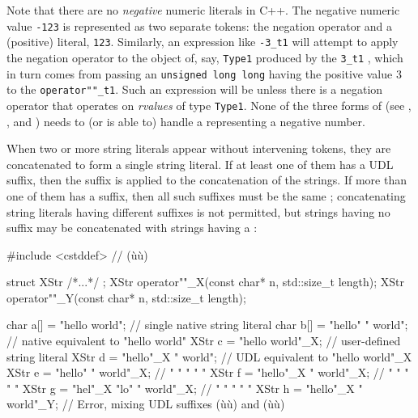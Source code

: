 Note that there are no \emph{negative} numeric literals in C++. The
negative numeric value \lstinline!-123! is represented as two separate
tokens: the negation operator and a (positive) literal, \lstinline!123!.
Similarly, an expression like \lstinline!-3_t1! will attempt to apply the
negation operator to the object of, say, \lstinline!Type1! produced by the
\lstinline!3_t1! , which in turn comes from passing an
\lstinline!unsigned!~\lstinline!long!~\lstinline!long! having the positive value
3 to the  \lstinline!operator""_t1!. Such an
expression will be  unless there is a negation
operator that operates on \emph{rvalues} of type \lstinline!Type1!. None of
the three forms of  (see , , and ) needs to (or
is able to) handle a  representing a negative
number.

When two or more string literals appear without intervening tokens, they
are concatenated to form a single string literal. If at least one of
them has a UDL suffix, then the suffix is applied to the concatenation
of the  strings. If more than one of them has a
suffix, then all such suffixes must be the same ;
concatenating string literals having different suffixes is not
permitted, but strings having no suffix may be concatenated with strings
having a :

\begin{emcppslisting}
#include <cstddef>  // (ù{}ù)

struct XStr { /*...*/ };
XStr operator""_X(const char* n, std::size_t length);
XStr operator""_Y(const char* n, std::size_t length);

char a[] = "hello world";            // single native string literal
char b[] = "hello"      " world";    // native equivalent to "hello world"
XStr c   = "hello world"_X;          // user-defined string literal
XStr d   = "hello"_X    " world";    // UDL equivalent to "hello world"_X
XStr e   = "hello"      " world"_X;  //  "      "      "     "     "
XStr f   = "hello"_X    " world"_X;  //  "      "      "     "     "
XStr g   = "hel"_X "lo" " world"_X;  //  "      "      "     "     "
XStr h   = "hello"_X    " world"_Y;  // Error, mixing UDL suffixes (ù{}ù) and (ù{}ù)
\end{emcppslisting}
    
